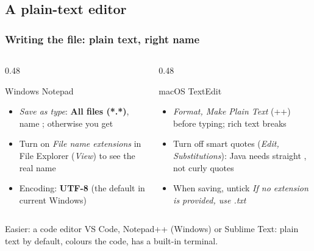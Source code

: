 \documentclass[aspectratio=169,10pt,compress]{beamer}
\begin{document}
\subsection[Editor]{A plain-text editor}




\begin{frame}[t,fragile] \frametitle{Writing the file: plain text, right name}
  \begin{columns}[T]
    \begin{column}{0.48\textwidth}
      \begin{block}{Windows Notepad}
        \footnotesize
        \begin{itemize}
          \item \emph{Save as type}: \textbf{All files (*.*)}, name ; otherwise you get 
          \item Turn on \emph{File name extensions} in File Explorer (\emph{View}) to see the real name
          \item Encoding: \textbf{UTF-8} (the default in current Windows)
        \end{itemize}
      \end{block}
    \end{column}
    \begin{column}{0.48\textwidth}
      \begin{block}{macOS TextEdit}
        \footnotesize
        \begin{itemize}
          \item \emph{Format, Make Plain Text} (++) before typing; rich text breaks 
          \item Turn off smart quotes (\emph{Edit, Substitutions}): Java needs straight , not curly quotes
          \item When saving, untick \emph{If no extension is provided, use .txt}
        \end{itemize}
      \end{block}
    \end{column}
  \end{columns}
  \vspace{0.3em}
  \begin{alertblock}{Easier: a code editor}
    \small VS Code, Notepad++ (Windows) or Sublime Text: plain text by default, colours the code, has a built-in terminal.
  \end{alertblock}
\end{frame}
\end{document}
